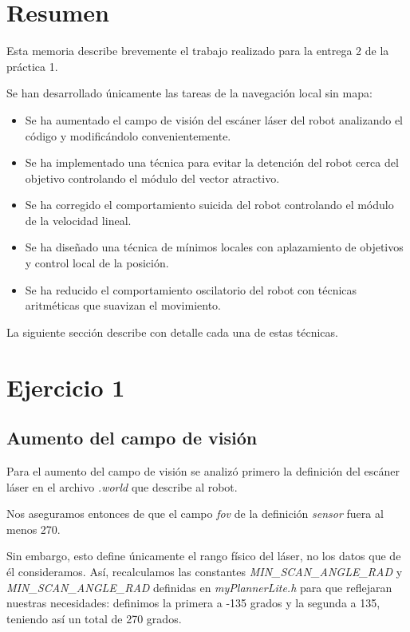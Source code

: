 \documentclass[a4paper, 11pt, titlepage]{article}
\begin{document}
  \maketitle
  \tableofcontents
  \newpage

  \section{Resumen}
  Esta memoria describe brevemente el trabajo realizado para la entrega 2 de la práctica 1.

  Se han desarrollado únicamente las tareas de la navegación local sin mapa:
  \begin{itemize}
      \item Se ha aumentado el campo de visión del escáner láser del robot analizando el código y modificándolo convenientemente.
      \item Se ha implementado una técnica para evitar la detención del robot cerca del objetivo controlando el módulo del vector atractivo.
      \item Se ha corregido el comportamiento suicida del robot controlando el módulo de la velocidad lineal.
      \item Se ha diseñado una técnica de mínimos locales con aplazamiento de objetivos y control local de la posición.
      \item Se ha reducido el comportamiento oscilatorio del robot con técnicas aritméticas que suavizan el movimiento.
  \end{itemize}

  La siguiente sección describe con detalle cada una de estas técnicas.

  \section{Ejercicio 1}

  \subsection{Aumento del campo de visión}
  Para el aumento del campo de visión se analizó primero la definición del escáner láser en el archivo \emph{.world} que describe al robot.

  Nos aseguramos entonces de que el campo \emph{fov} de la definición \emph{sensor} fuera al menos 270.

  Sin embargo, esto define únicamente el rango físico del láser, no los datos que de él consideramos. Así, recalculamos las constantes \emph{MIN_SCAN_ANGLE_RAD} y \emph{MIN_SCAN_ANGLE_RAD} definidas en \emph{myPlannerLite.h} para que reflejaran nuestras necesidades: definimos la primera  a -135 grados y la segunda a 135, teniendo así un total de 270 grados.
\end{document}
